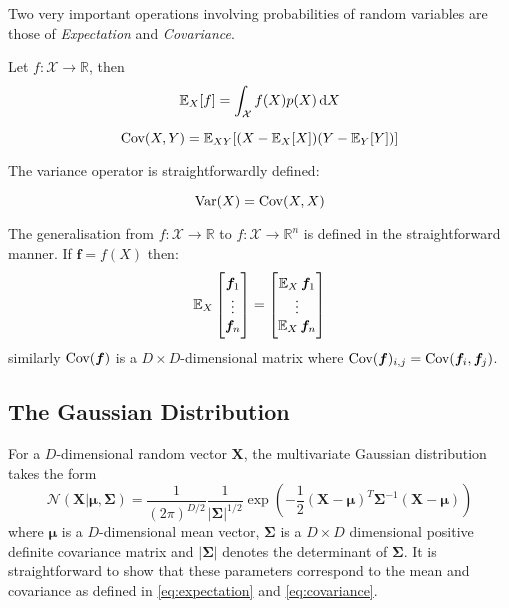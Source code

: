 Two very important operations involving probabilities of random variables are
those of \textit{Expectation} and \textit{Covariance}.
\begin{definition}[Expectation]
  \label{eq:expectation}
  Let $f : \mathcal{X} \to \mathbb{R}$, then
  \begin{equation*}
    \E_X[f] = \int_{\mathcal{X}} f(X) p(X) \dif X
  \end{equation*}
\end{definition}
\begin{definition}[Covariance]
  \label{eq:covariance}
  \begin{equation*}
    \operatorname{\textnormal{Cov}}(X, Y) = \operatorname{\mathbb{E}}_{XY}[(X - \operatorname{\mathbb{E}}_X[X])(Y - \operatorname{\mathbb{E}}_Y[Y])]
  \end{equation*}
\end{definition}
The variance operator is straightforwardly defined:
\begin{definition}[Variance]
  \label{eq:variance}
  \begin{equation*}
    \operatorname{\textnormal{Var}}(X) = \operatorname{\textnormal{Cov}}(X, X)
  \end{equation*}
\end{definition}

The generalisation from $f: \mathcal{X} \to \mathbb{R}$ to $f: \mathcal{X} \to
\mathbb{R}^n$ is defined in the straightforward manner. If $\bm{f} =
f(X)$ then:
\begin{equation*}
  \operatorname{\mathbb{E}}_X
  \begin{bmatrix}
    \bm{f}_1 \\
    \vdots \\
    \bm{f}_n \\
  \end{bmatrix} =
  \begin{bmatrix}
    \operatorname{\mathbb{E}}_X \bm{f}_1 \\
    \vdots \\
    \operatorname{\mathbb{E}}_X \bm{f}_n \\
  \end{bmatrix}
\end{equation*}
similarly $\operatorname{\textnormal{Cov}}(\bm{f})$ is a $D \times D$-dimensional matrix where
$\operatorname{\textnormal{Cov}}(\bm{f})_{i,j} = \operatorname{\textnormal{Cov}}(\bm{f}_i, \bm{f}_j)$\cite{Bishop:2006, Barber:2012:BRM:2207809}.

\subsection{The Gaussian Distribution}

For a $D$-dimensional random vector $\bm{X}$, the multivariate Gaussian
distribution takes the form
\begin{equation}
  \label{eq:Gaussian_dist}
  \mathcal{N}(\bm{X} | \bm{\mu}, \bm{\Sigma}) = \frac{1}{(2\pi)^{D/2}}\frac{1}{|\bm{\Sigma}|^{1/2}}\exp\left( -\frac{1}{2}(\bm{X} - \bm{\mu})^T\bm{\Sigma}^{-1}(\bm{X} - \bm{\mu})\right)
\end{equation}
where $\bm{\mu}$ is a $D$-dimensional mean vector, $\bm{\Sigma}$ is a $D \times
D$ dimensional positive definite covariance matrix and $|\bm{\Sigma}|$ denotes
the determinant of $\bm{\Sigma}$. It is straightforward to show that these
parameters correspond to the mean and covariance as defined in
\ref{eq:expectation} and \ref{eq:covariance}\cite{Barber:2012:BRM:2207809}.

